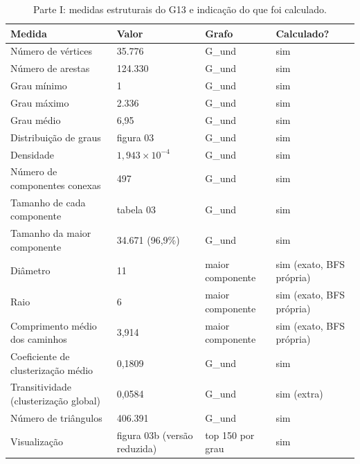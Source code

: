 \begin{table}[htbp]
\centering
\small
\caption{Parte I: medidas estruturais do G13 e indicação do que foi calculado.}
\label{tab:03_parte1_medidas}
\begin{tabular}{llll}
\toprule
Medida & Valor & Grafo & Calculado? \\
\midrule
Número de vértices & 35.776 & G\_und & sim \\
Número de arestas & 124.330 & G\_und & sim \\
Grau mínimo & 1 & G\_und & sim \\
Grau máximo & 2.336 & G\_und & sim \\
Grau médio & 6,95 & G\_und & sim \\
Distribuição de graus & figura 03 & G\_und & sim \\
Densidade & $1,943 \times 10^{-4}$ & G\_und & sim \\
Número de componentes conexas & 497 & G\_und & sim \\
Tamanho de cada componente & tabela 03 & G\_und & sim \\
Tamanho da maior componente & 34.671 (96,9\%) & G\_und & sim \\
Diâmetro & 11 & maior componente & sim (exato, BFS própria) \\
Raio & 6 & maior componente & sim (exato, BFS própria) \\
Comprimento médio dos caminhos & 3,914 & maior componente & sim (exato, BFS própria) \\
Coeficiente de clusterização médio & 0,1809 & G\_und & sim \\
Transitividade (clusterização global) & 0,0584 & G\_und & sim (extra) \\
Número de triângulos & 406.391 & G\_und & sim \\
Visualização & figura 03b (versão reduzida) & top 150 por grau & sim \\
\bottomrule
\end{tabular}
\end{table}
